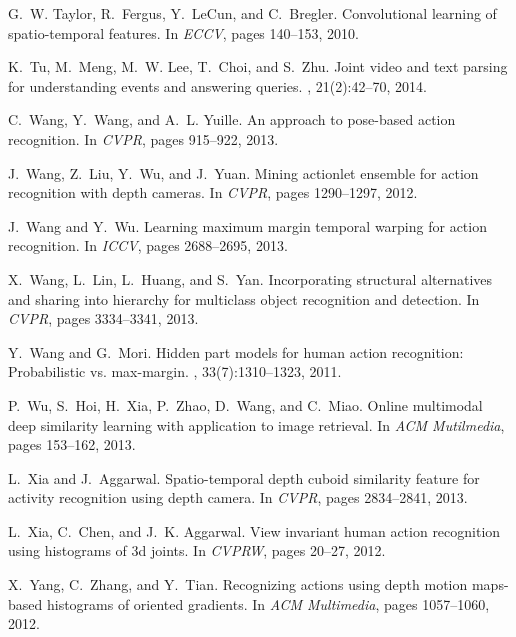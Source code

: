\documentclass{sig-alternate}
\begin{document}
\begin{thebibliography}{40}
G.~W. Taylor, R.~Fergus, Y.~LeCun, and C.~Bregler.
\newblock Convolutional learning of spatio-temporal features.
\newblock In {\em ECCV}, pages 140--153, 2010.

K.~Tu, M.~Meng, M.~W. Lee, T.~Choi, and S.~Zhu.
\newblock Joint video and text parsing for understanding events and answering
  queries.
, 21(2):42--70, 2014.

C.~Wang, Y.~Wang, and A.~L. Yuille.
\newblock An approach to pose-based action recognition.
\newblock In {\em CVPR}, pages 915--922, 2013.


J.~Wang, Z.~Liu, Y.~Wu, and J.~Yuan.
\newblock Mining actionlet ensemble for action recognition with depth cameras.
\newblock In {\em CVPR}, pages 1290--1297, 2012.

\vfill\eject

J.~Wang and Y.~Wu.
\newblock Learning maximum margin temporal warping for action recognition.
\newblock In {\em ICCV}, pages 2688--2695, 2013.


X.~Wang, L.~Lin, L.~Huang, and S.~Yan.
\newblock Incorporating structural alternatives and sharing into hierarchy for
  multiclass object recognition and detection.
\newblock In {\em CVPR}, pages 3334--3341, 2013.


Y.~Wang and G.~Mori.
\newblock Hidden part models for human action recognition: Probabilistic vs.
  max-margin.
, 33(7):1310--1323,
  2011.

P.~Wu, S.~Hoi, H.~Xia, P.~Zhao, D.~Wang, and C.~Miao.
\newblock Online multimodal deep similarity learning with application to image
  retrieval.
\newblock In {\em ACM Mutilmedia}, pages 153--162, 2013.

L.~Xia and J.~Aggarwal.
\newblock Spatio-temporal depth cuboid similarity feature for activity
  recognition using depth camera.
\newblock In {\em CVPR}, pages 2834--2841, 2013.

L.~Xia, C.~Chen, and J.~K. Aggarwal.
\newblock View invariant human action recognition using histograms of 3d
  joints.
\newblock In {\em CVPRW}, pages 20--27, 2012.

X.~Yang, C.~Zhang, and Y.~Tian.
\newblock Recognizing actions using depth motion maps-based histograms of
  oriented gradients.
\newblock In {\em ACM Multimedia}, pages 1057--1060, 2012.


\end{thebibliography}
\end{document}
